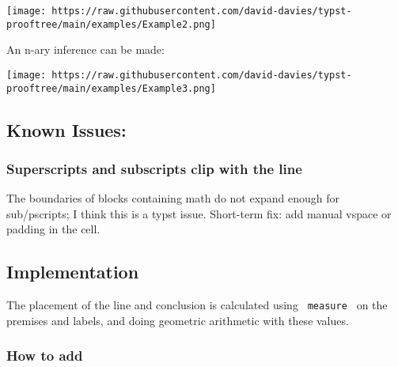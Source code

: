 \texttt{[image: https://raw.githubusercontent.com/david-davies/typst-prooftree/main/examples/Example2.png]}

An n-ary inference can be made:

\begin{Shaded}
\begin{Highlighting}[]

\NormalTok{)}
\end{Highlighting}
\end{Shaded}

\texttt{[image: https://raw.githubusercontent.com/david-davies/typst-prooftree/main/examples/Example3.png]}

\subsection{Known Issues:}\label{known-issues}

\subsubsection{Superscripts and subscripts clip with the
line}\label{superscripts-and-subscripts-clip-with-the-line}

The boundaries of blocks containing math do not expand enough for
sub/pscripts; I think this is a typst issue. Short-term fix: add manual
vspace or padding in the cell.

\subsection{Implementation}\label{implementation}

The placement of the line and conclusion is calculated using
\texttt{\ measure\ } on the premises and labels, and doing geometric
arithmetic with these values.

\subsubsection{How to add}\label{how-to-add}

